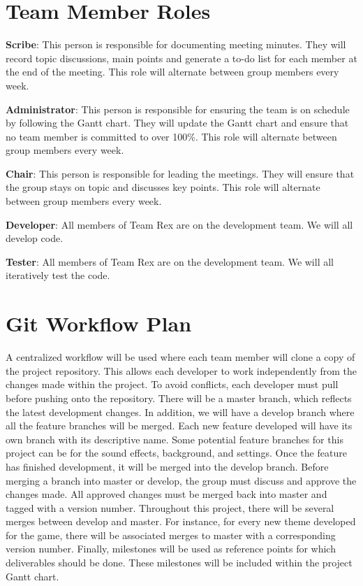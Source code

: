 \documentclass{article}
\begin{document}
	\section{Team Member Roles}
	
	\textbf{Scribe}: This person is responsible for documenting meeting minutes. They will record topic discussions, main points and generate a to-do list for each member at the end of the meeting. This role will alternate between group members every week. 
	
	\textbf{Administrator}: This person is responsible for ensuring the team is on schedule by following the Gantt chart. They will update the Gantt chart and ensure that no team member is committed to over 100\%. This role will alternate between group members every week. 
	
	\textbf{Chair}: This person is responsible for leading the meetings. They will ensure that the group stays on topic and discusses key points. This role will alternate between group members every week. 
	
	\textbf{Developer}: All members of Team Rex are on the development team. We will all develop code. 
	
	\textbf{Tester}: All members of Team Rex are on the development team. We will all iteratively test the code. 
	
	
	
	\section{Git Workflow Plan}

	A centralized workflow will be used where each team member will clone a copy of the project repository.
	This allows each developer to work independently from the changes made within the project. 
	To avoid conflicts, each developer must pull before pushing onto the repository. 
	There will be a master branch, which reflects the latest development changes. 
	In addition, we will have a develop branch where all the feature branches will be merged.
	Each new feature developed will have its own branch with its descriptive name.
	Some potential feature branches for this project can be for the sound effects, background, and settings. 
	Once the feature has finished development, it will be merged into the develop branch. 
	Before merging a branch into master or develop, the group must discuss and approve the changes made. 
	All approved changes must be merged back into master and tagged with a version number. 
	Throughout this project, there will be several merges between develop and master. 
	For instance, for every new theme developed for the game, there will be associated merges to master with a corresponding version number. Finally, milestones will be used as reference points for which deliverables should be done. These milestones will be included within the project Gantt chart.
\end{document}
